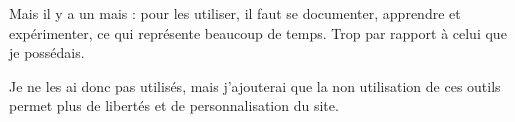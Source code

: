 Mais il y a un mais : pour les utiliser, il faut se documenter, apprendre et expérimenter, ce qui représente beaucoup de temps. Trop par rapport à celui que je possédais.

Je ne les ai donc pas utilisés, mais j'ajouterai que la non utilisation de ces outils permet plus de libertés et de personnalisation du site.


